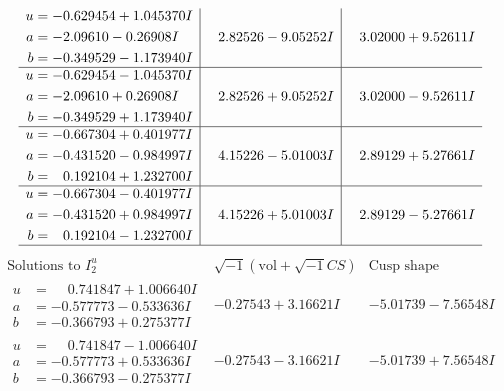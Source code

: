 \documentclass[1p]{elsarticle_modified}
\theoremstyle{definition}
\newcommand{\I}{\sqrt{-1}}
\begin{document}
$$\begin{array}{c|c|c}
\begin{aligned}
u &= -0.629454 + 1.045370 I \\
a &= -2.09610 - 0.26908 I \\
b &= -0.349529 - 1.173940 I\end{aligned}
 & \phantom{-}2.82526 - 9.05252 I & \phantom{-}3.02000 + 9.52611 I \\ \hline\begin{aligned}
u &= -0.629454 - 1.045370 I \\
a &= -2.09610 + 0.26908 I \\
b &= -0.349529 + 1.173940 I\end{aligned}
 & \phantom{-}2.82526 + 9.05252 I & \phantom{-}3.02000 - 9.52611 I \\ \hline\begin{aligned}
u &= -0.667304 + 0.401977 I \\
a &= -0.431520 - 0.984997 I \\
b &= \phantom{-}0.192104 + 1.232700 I\end{aligned}
 & \phantom{-}4.15226 - 5.01003 I & \phantom{-}2.89129 + 5.27661 I \\ \hline\begin{aligned}
u &= -0.667304 - 0.401977 I \\
a &= -0.431520 + 0.984997 I \\
b &= \phantom{-}0.192104 - 1.232700 I\end{aligned}
 & \phantom{-}4.15226 + 5.01003 I & \phantom{-}2.89129 - 5.27661 I\\
 \hline 
 \end{array}$$\newpage$$\begin{array}{c|c|c}  
\text{Solutions to }I^u_{2}& \I (\text{vol} + \sqrt{-1}CS) & \text{Cusp shape}\\
 \hline 
\begin{aligned}
u &= \phantom{-}0.741847 + 1.006640 I \\
a &= -0.577773 - 0.533636 I \\
b &= -0.366793 + 0.275377 I\end{aligned}
 & -0.27543 + 3.16621 I & -5.01739 - 7.56548 I \\ \hline\begin{aligned}
u &= \phantom{-}0.741847 - 1.006640 I \\
a &= -0.577773 + 0.533636 I \\
b &= -0.366793 - 0.275377 I\end{aligned}
 & -0.27543 - 3.16621 I & -5.01739 + 7.56548 I \\ \hline\begin{aligned}

\end{aligned}
\end{array}$$
\end{document}
